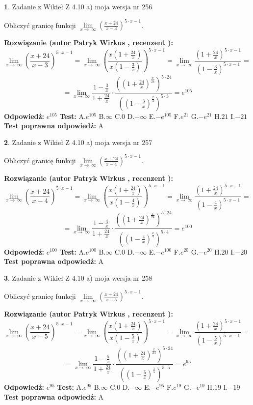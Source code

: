 \documentclass[12pt, a4paper]{article}
\theoremstyle{definition} %
\newtheorem{zad}{}
\newcommand{\zadStart}[1]{\begin{zad}#1\newline}
\newcommand{\zadStop}{\end{zad}}
\newcommand{\rozwStart}[2]{\noindent \textbf{Rozwiązanie (autor #1 , recenzent #2): }\newline}
\newcommand{\rozwStop}{\newline}
\newcommand{\odpStart}{\noindent \textbf{Odpowiedź:}\newline}
\newcommand{\odpStop}{\newline}
\newcommand{\testStart}{\noindent \textbf{Test:}\newline}
\newcommand{\testStop}{\newline}
\newcommand{\kluczStart}{\noindent \textbf{Test poprawna odpowiedź:}\newline}
\newcommand{\kluczStop}{\newline}
\begin{document}
\zadStart{Zadanie z Wikieł Z 4.10 a) moja wersja nr 256}

Obliczyć granicę funkcji  $\lim\limits_{x\to\ \infty}(\frac{x+24}{x-3})^{5\cdot x-1}$.
\zadStop
\rozwStart{Patryk Wirkus}{}
$$\lim\limits_{x\to\ \infty}(\frac{x+24}{x-3})^{5\cdot x-1} = \lim\limits_{x\to\ \infty}(\frac{x(1+\frac{24}{x})}{x(1-\frac{3}{x})})^{5\cdot x-1}=\lim\limits_{x\to\ \infty}\frac{(1+\frac{24}{x})^{5\cdot x-1}}{(1-\frac{3}{x})^{5\cdot x-1}}=$$
$$=\lim\limits_{x\to\ \infty}\frac{1-\frac{3}{x}}{1+\frac{24}{x}}\cdot\frac{((1+\frac{24}{x})^{\frac{x}{24}})^{5\cdot24}}{((1-\frac{3}{x})^{\frac{x}{3}})^{5\cdot3}}=e^{105}$$
\rozwStop
\odpStart
$e^{105}$
\odpStop
\testStart
A.$e^{105}$ B.$\infty$ C.$0$ D.$-\infty$ E.$-e^{105}$
F.$e^{21}$ G.$-e^{21}$
H.$21$
I.$-21$
\testStop
\kluczStart
A
\kluczStop



\zadStart{Zadanie z Wikieł Z 4.10 a) moja wersja nr 257}

Obliczyć granicę funkcji  $\lim\limits_{x\to\ \infty}(\frac{x+24}{x-4})^{5\cdot x-1}$.
\zadStop
\rozwStart{Patryk Wirkus}{}
$$\lim\limits_{x\to\ \infty}(\frac{x+24}{x-4})^{5\cdot x-1} = \lim\limits_{x\to\ \infty}(\frac{x(1+\frac{24}{x})}{x(1-\frac{4}{x})})^{5\cdot x-1}=\lim\limits_{x\to\ \infty}\frac{(1+\frac{24}{x})^{5\cdot x-1}}{(1-\frac{4}{x})^{5\cdot x-1}}=$$
$$=\lim\limits_{x\to\ \infty}\frac{1-\frac{4}{x}}{1+\frac{24}{x}}\cdot\frac{((1+\frac{24}{x})^{\frac{x}{24}})^{5\cdot24}}{((1-\frac{4}{x})^{\frac{x}{4}})^{5\cdot4}}=e^{100}$$
\rozwStop
\odpStart
$e^{100}$
\odpStop
\testStart
A.$e^{100}$ B.$\infty$ C.$0$ D.$-\infty$ E.$-e^{100}$
F.$e^{20}$ G.$-e^{20}$
H.$20$
I.$-20$
\testStop
\kluczStart
A
\kluczStop



\zadStart{Zadanie z Wikieł Z 4.10 a) moja wersja nr 258}

Obliczyć granicę funkcji  $\lim\limits_{x\to\ \infty}(\frac{x+24}{x-5})^{5\cdot x-1}$.
\zadStop
\rozwStart{Patryk Wirkus}{}
$$\lim\limits_{x\to\ \infty}(\frac{x+24}{x-5})^{5\cdot x-1} = \lim\limits_{x\to\ \infty}(\frac{x(1+\frac{24}{x})}{x(1-\frac{5}{x})})^{5\cdot x-1}=\lim\limits_{x\to\ \infty}\frac{(1+\frac{24}{x})^{5\cdot x-1}}{(1-\frac{5}{x})^{5\cdot x-1}}=$$
$$=\lim\limits_{x\to\ \infty}\frac{1-\frac{5}{x}}{1+\frac{24}{x}}\cdot\frac{((1+\frac{24}{x})^{\frac{x}{24}})^{5\cdot24}}{((1-\frac{5}{x})^{\frac{x}{5}})^{5\cdot5}}=e^{95}$$
\rozwStop
\odpStart
$e^{95}$
\odpStop
\testStart
A.$e^{95}$ B.$\infty$ C.$0$ D.$-\infty$ E.$-e^{95}$
F.$e^{19}$ G.$-e^{19}$
H.$19$
I.$-19$
\testStop
\kluczStart
A
\kluczStop
\end{document}
